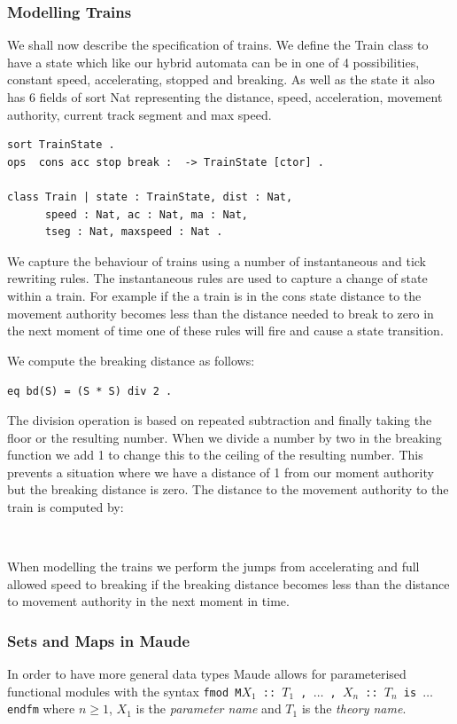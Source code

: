 \subsubsection*{Modelling Trains}
We shall now describe the specification of trains. We define the Train class to have a state which like our hybrid automata can be in one of 4 possibilities, constant speed, accelerating, stopped and breaking. As well as the state it also has 6 fields of sort Nat representing the distance, speed, acceleration, movement authority,  current track segment and max speed.

\begin{lstlisting}
sort TrainState .
ops  cons acc stop break :  -> TrainState [ctor] .

class Train | state : TrainState, dist : Nat, 
      speed : Nat, ac : Nat, ma : Nat, 
      tseg : Nat, maxspeed : Nat .
\end{lstlisting}

We capture the behaviour of trains using a number of instantaneous and tick rewriting rules. The instantaneous rules are used to capture a change of state within a train. For example if the a train is in the cons state distance to the movement authority becomes less than the distance needed to break to zero in the next moment of time one of these rules will fire and cause a state transition. 

We compute the breaking distance as follows: 
\begin{center}\texttt{eq bd(S) = (S * S) div 2 .}\end{center}


The division operation is based on repeated subtraction and finally taking the floor or the resulting number. When we divide a number by two in the breaking function we add 1 to change this to the ceiling of the resulting number. This prevents a situation where we have a distance of 1 from our moment authority but the breaking distance is zero.
The distance to the movement authority to the train is computed by:
\begin{center}
\texttt{} \\
\texttt{}
\end{center}

When modelling the trains we perform the jumps from accelerating and full allowed speed to breaking if the breaking distance becomes less than the distance to movement authority in the next moment in time.


\subsubsection*{Sets and Maps in Maude}
In order to have more general data types Maude allows for parameterised functional modules with the  syntax \texttt{fmod M{$X_1$ :: $T_1$ , $\ldots$ , $X_n$ :: $T_n$} is $\ldots$ endfm} where $n \geq 1$, $X_1$ is the \emph{parameter name} and $T_1$ is the \emph{theory name}.

